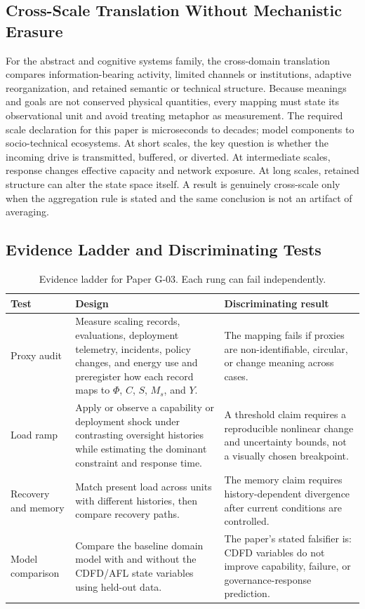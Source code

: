 \documentclass[11pt,a4paper]{article}
\begin{document}
\subsection{Cross-Scale Translation Without Mechanistic Erasure}

For the abstract and cognitive systems family, the cross-domain translation compares information-bearing activity, limited channels or institutions, adaptive reorganization, and retained semantic or technical structure. Because meanings and goals are not conserved physical quantities, every mapping must state its observational unit and avoid treating metaphor as measurement. \cite{Shannon1948,BarabasiAlbert1999,WattsStrogatz1998,Turing1952,BakTangWiesenfeld1987}
The required scale declaration for this paper is microseconds to decades; model components to socio-technical ecosystems. At short
scales, the key question is whether the incoming drive is transmitted,
buffered, or diverted. At intermediate scales, response changes effective
capacity and network exposure. At long scales, retained structure can alter the
state space itself. A result is genuinely cross-scale only when the aggregation
rule is stated and the same conclusion is not an artifact of averaging.

\subsection{Evidence Ladder and Discriminating Tests}

\begin{table}[htbp]
\centering
\small
\caption{Evidence ladder for Paper G-03. Each rung can fail independently.}
\begin{tabularx}{\textwidth}{|p{}|X|X|}
\hline
\textbf{Test} & \textbf{Design} & \textbf{Discriminating result} \\
\hline
Proxy audit & Measure scaling records, evaluations, deployment telemetry, incidents, policy changes, and energy use and preregister how each record maps to $\Phi$, $C$, $S$, $M_s$, and $Y$. & The mapping fails if proxies are non-identifiable, circular, or change meaning across cases. \\
\hline
Load ramp & Apply or observe a capability or deployment shock under contrasting oversight histories while estimating the dominant constraint and response time. & A threshold claim requires a reproducible nonlinear change and uncertainty bounds, not a visually chosen breakpoint. \\
\hline
Recovery and memory & Match present load across units with different histories, then compare recovery paths. & The memory claim requires history-dependent divergence after current conditions are controlled. \\
\hline
Model comparison & Compare the baseline domain model with and without the CDFD/AFL state variables using held-out data. & The paper's stated falsifier is: CDFD variables do not improve capability, failure, or governance-response prediction. \\
\hline
\end{tabularx}
\end{table}
\end{document}
